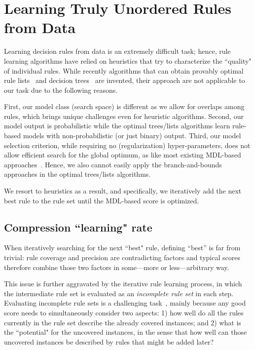 \section{Learning Truly Unordered Rules from Data}
Learning decision rules from data is an extremely difficult task; hence, rule learning algorithms have relied on heuristics that try to characterize the ``quality" of individual rules. While recently algorithms that can obtain provably optimal rule lists~\citep{angelino2017learning} and decision trees~\citep{hu2019optimal} are invented, their approach are not applicable to our task due to the following reasons. 

First, our model class (search space) is different as we allow for overlaps among rules, which brings unique challenges even for heuristic algorithms. Second, our model output is probabilistic while the optimal trees/lists algorithms learn rule-based models with non-probabilistic (or just binary) output. Third, our model selection criterion, while requiring no (regularization) hyper-parameters, does not allow efficient search for the global optimum, as like most existing MDL-based approaches~\citep{galbrun2022minimum}. Hence, we also cannot easily apply the branch-and-bounds approaches in the optimal trees/lists algorithms. 

We resort to heuristics as a result, and specifically, we iteratively add the next best rule to the rule set until the MDL-based score is optimized. 

\subsection{Compression ``learning" rate}
When iteratively searching for the next ``best" rule, defining ``best'' is far from trivial: rule coverage and precision are contradicting factors and typical scores therefore combine those two factors in some---more or less---arbitrary way. 

This issue is further aggravated by the iterative rule learning process, in which the intermediate rule set is evaluated as an \emph{incomplete rule set} in each step. Evaluating incomplete rule sets is a challenging task~\citep{furnkranz2005roc}, mainly because any good score needs to simultaneously consider two aspects: 1) how well do all the rules currently in the rule set describe the already covered instances; and 2) what is the ``potential" for the uncovered instances, in the sense that how well can those uncovered instances be described by rules that might be added later?


